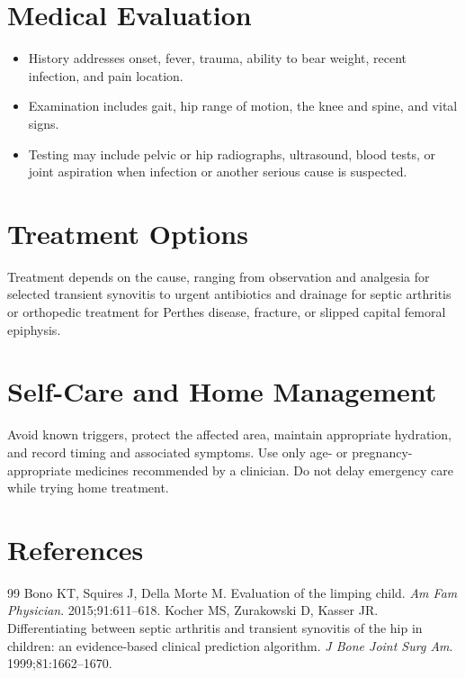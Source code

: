 \section*{Medical Evaluation}
\begin{itemize}
  \item History addresses onset, fever, trauma, ability to bear weight, recent infection, and pain location.
  \item Examination includes gait, hip range of motion, the knee and spine, and vital signs.
  \item Testing may include pelvic or hip radiographs, ultrasound, blood tests, or joint aspiration when infection or another serious cause is suspected.
\end{itemize}

\section*{Treatment Options}
Treatment depends on the cause, ranging from observation and analgesia for selected transient synovitis to urgent antibiotics and drainage for septic arthritis or orthopedic treatment for Perthes disease, fracture, or slipped capital femoral epiphysis.

\section*{Self-Care and Home Management}
Avoid known triggers, protect the affected area, maintain appropriate hydration, and record timing and associated symptoms. Use only age- or pregnancy-appropriate medicines recommended by a clinician. Do not delay emergency care while trying home treatment.

\section*{References}
\begin{thebibliography}{99}
 Bono KT, Squires J, Della Morte M. Evaluation of the limping child. \textit{Am Fam Physician}. 2015;91:611--618.
 Kocher MS, Zurakowski D, Kasser JR. Differentiating between septic arthritis and transient synovitis of the hip in children: an evidence-based clinical prediction algorithm. \textit{J Bone Joint Surg Am}. 1999;81:1662--1670.
\end{thebibliography}
